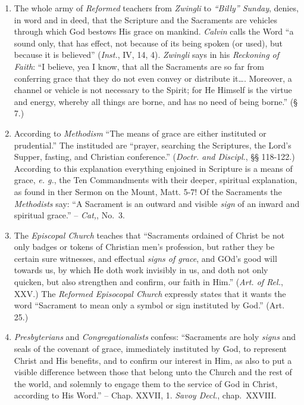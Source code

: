 \documentclass[
]{book}
\begin{document}
\begin{enumerate}
\def\labelenumi{\arabic{enumi}.}
\item
  The whole army of \emph{Reformed} teachers from \emph{Zwingli} to \emph{``Billy'' Sunday}, denies, in word and in deed, that the Scripture and the Sacraments are vehicles through which God bestows His grace on mankind. \emph{Calvin} calls the Word ``a sound only, that has effect, not because of its being spoken (or used), but because it is believed'' (\emph{Inst.}, IV, 14, 4). \emph{Zwingli} says in his \emph{Reckoning of Faith}: ``I believe, yea I know, that all the Sacraments are so far from conferring grace that they do not even convey or distribute it\ldots. Moreover, a channel or vehicle is not necessary to the Spirit; for He Himself is the virtue and energy, whereby all things are borne, and has no need of being borne.'' (§ 7.)
\item
  According to \emph{Methodism} ``The means of grace are either instituted or prudential.'' The instituded are ``prayer, searching the Scriptures, the Lord's Supper, fasting, and Christian conference.'' (\emph{Doctr. and Discipl.}, §§ 118-122.) According to this explanation everything enjoined in Scripture is a means of grace, \emph{e. g.}, the Ten Commandments with their deeper, spiritual explanation, as found in ther Sermon on the Mount, Matt. 5-7! Of the Sacraments the \emph{Methodists} say: ``A Sacrament is an outward and visible \emph{sign} of an inward and spiritual grace.'' -- \emph{Cat,}, No.~3.
\item
  The \emph{Episcopal Church} teaches that ``Sacraments ordained of Christ be not only badges or tokens of Christian men's profession, but rather they be certain sure witnesses, and effectual \emph{signs of grace}, and GOd's good will towards us, by which He doth work invisibly in us, and doth not only quicken, but also strengthen and confirm, our faith in Him.'' (\emph{Art. of Rel.}, XXV.) The \emph{Reformed Episocopal Church} expressly states that it wants the word ``Sacrament to mean only a symbol or sign instituted by God.'' (Art. 25.)
\item
  \emph{Presbyterians} and \emph{Congregationalists} confess: ``Sacraments are holy \emph{signs} and seals of the covenant of grace, immediately instituted by God, to represent Christ and His benefits, and to confirm our interest in Him, as also to put a visible difference between those that belong unto the Church and the rest of the world, and solemnly to engage them to the service of God in Christ, according to His Word.'' -- Chap. XXVII, 1. \emph{Savoy Decl.}, chap.~XXVIII.
\end{enumerate}
\end{document}
